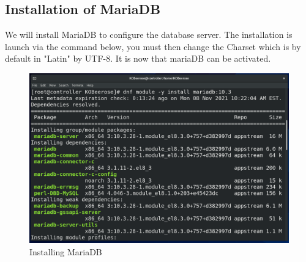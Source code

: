 \begin{spacing}{1.2}
\section{Installation of MariaDB}

\par We will install MariaDB to configure the database server. The installation is launch via the command below, you must then change the Charset which is by default in "Latin" by UTF-8. It is now that mariaDB can be activated.\\

\begin{figure}[!htb] 
\begin{center} 
\includegraphics[width=1\linewidth]{Cloud/Config/Installing MariaDB} 
\end{center} 
\caption{Installing MariaDB} 
\end{figure}  \FloatBarrier
\\


\end{spacing}
